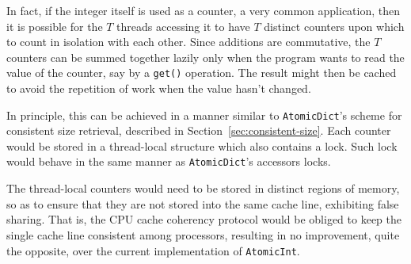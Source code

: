 In fact, if the integer itself is used as a counter, a very common application, then it is possible for the $T$ threads accessing it to have $T$ distinct counters upon which to count in isolation with each other.
Since additions are commutative, the $T$ counters can be summed together lazily only when the program wants to read the value of the counter, say by a \texttt{{get()}} operation.
The result might then be cached to avoid the repetition of work when the value hasn't changed.

In principle, this can be achieved in a manner similar to \texttt{AtomicDict}'s scheme for consistent size retrieval, described in Section~\ref{sec:consistent-size}.
Each counter would be stored in a thread-local structure which also contains a lock.
Such lock would behave in the same manner as \texttt{AtomicDict}'s accessors locks.

The thread-local counters would need to be stored in distinct regions of memory, so as to ensure that they are not stored into the same cache line, exhibiting false sharing.
That is, the CPU cache coherency protocol would be obliged to keep the single cache line consistent among processors, resulting in no improvement, quite the opposite, over the current implementation of \texttt{AtomicInt}.
